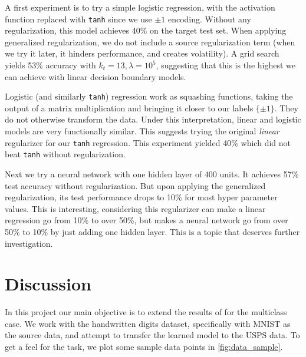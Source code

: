 \documentclass[twoside,11pt]{article}
\begin{document}
A first experiment is to try a simple logistic regression, with the activation function replaced with \texttt{tanh} since we use $\pm 1$ encoding. Without any regularization, this model achieves 40\% on the target test set. When applying generalized regularization, we do not include a source regularization term (when we try it later, it hinders performance, and creates volatility). A grid search yields 53\% accuracy with $k_t = 13, \lambda=10^5$, suggesting that this is the highest we can achieve with linear decision boundary models. 

Logistic (and similarly \texttt{tanh}) regression work as squashing functions, taking the output of a matrix multiplication and bringing it closer to our labels $\{\pm 1\}$. They do not otherwise transform the data. Under this interpretation, linear and logistic models are very functionally similar. This suggests trying the original \emph{linear} regularizer for our \texttt{tanh} regression. This experiment yielded 40\% which did not beat \texttt{tanh} without regularization.

Next we try a neural network with one hidden layer of 400 units. It achieves 57\% test accuracy without regularization. But upon applying the generalized regularization, its test performance drops to 10\% for most hyper parameter values. This is interesting, considering this regularizer can make a linear regression go from 10\% to over 50\%, but makes a neural network go from over 50\% to 10\% by just adding one hidden layer. This is a topic that deserves further investigation.  

\section{Discussion}

In this project our main objective is to extend the results of \cite{imani2022label} for the multiclass case. We work with the handwritten digits dataset, specifically with MNIST as the source data, and attempt to transfer the learned model to the USPS data. To get a feel for the task, we plot some sample data points in \ref{fig:data_sample}. 
\end{document}
